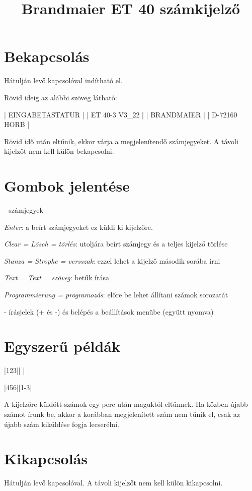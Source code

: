 \documentclass{article}
\begin{document}

\title{Brandmaier ET 40 számkijelző}
\date{}

\setlength{\droptitle}{-3cm}
\maketitle

\section*{Bekapcsolás}

Hátulján levő kapcsolóval indítható el.



Rövid ideig az alábbi szöveg látható:

|  EINGABETASTATUR   |
|  ET 40-3  V3_22    |
|    BRANDMAIER      |
|   D-72160 HORB     |

Rövid idő után eltűnik, ekkor várja a megjelenítendő számjegyeket. A távoli kijelzőt nem kell külön bekapcsolni.

\section*{Gombok jelentése}

- számjegyek

\keys{ } \emph{Enter}: a beírt számjegyeket ez küldi ki kijelzőre.

 \emph{Clear = Lösch = törlés}: utoljára beírt számjegy és a teljes kijelző törlése

 \emph{Stanza = Strophe = versszak}: ezzel lehet a kijelző második sorába írni

 \emph{Text = Text = szöveg}: betűk írása

 \emph{Programmierung = programozás}: előre be lehet állítani számok sorozatát

\keys{{+}}-\keys{{-}} írásjelek (+ és -) és belépés a beállítások menübe (együtt nyomva)

\section*{Egyszerű példák}

   \keys{ } \hfill {}|123||   |

     \keys{-}  \keys{ } \hfill {}|456||1-3|


A kijelzőre küldött számok egy perc után maguktól eltűnnek. Ha közben újabb számot írunk be, akkor a korábban megjelenített szám nem tűnik el, csak az újabb szám kiküldése fogja lecserélni.

\section*{Kikapcsolás}

Hátulján levő kapcsolóval. A távoli kijelzőt nem kell külön kikapcsolni.


\end{document}
